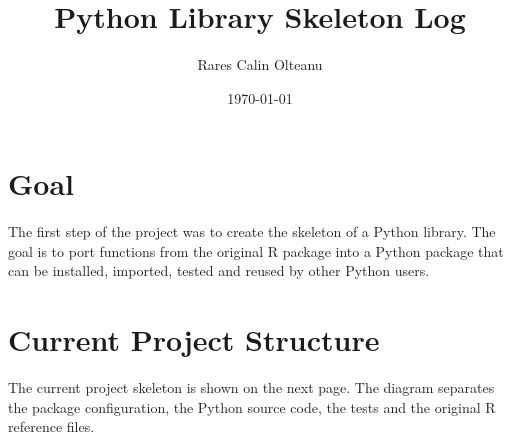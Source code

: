\documentclass[11pt]{article}
\title{Python Library Skeleton Log}
\author{Rares Calin Olteanu}
\date{\today}
\begin{document}
\maketitle

\section{Goal}

The first step of the project was to create the skeleton of a Python library.
The goal is to port functions from the original R package into a Python package
that can be installed, imported, tested and reused by other Python users.

\section{Current Project Structure}

The current project skeleton is shown on the next page. The diagram separates
the package configuration, the Python source code, the tests and the original
R reference files.
\end{document}
